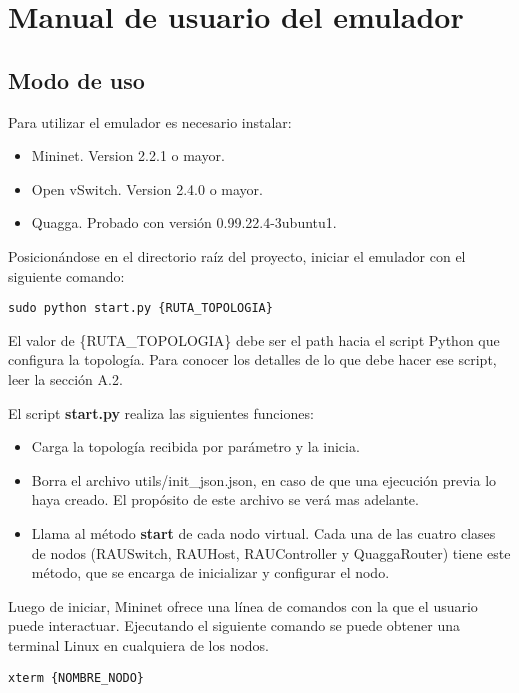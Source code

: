 
\graphicspath{{Appendix1/Figs/}}

\chapter{Manual de usuario del emulador}

\section{Modo de uso}
Para utilizar el emulador es necesario instalar:
\begin{itemize}
	\item Mininet. Version 2.2.1 o mayor.
	\item Open vSwitch. Version 2.4.0 o mayor.
	\item Quagga. Probado con versión 0.99.22.4-3ubuntu1.
\end{itemize}

Posicionándose en el directorio raíz del proyecto, iniciar el emulador con el siguiente comando:
\begin{lstlisting}
sudo python start.py {RUTA_TOPOLOGIA}
\end{lstlisting}

El valor de \{RUTA\_TOPOLOGIA\} debe ser el path hacia el script Python que configura la topología. Para conocer los detalles de lo que debe hacer ese script, leer la sección A.2.

El script \textbf{start.py} realiza las siguientes funciones:
\begin{itemize}
	\item Carga la topología recibida por parámetro y la inicia.
	\item Borra el archivo utils/init\_json.json, en caso de que una ejecución previa lo haya creado. El propósito de este archivo se verá mas adelante.
	\item Llama al método \textbf{start} de cada nodo virtual. Cada una de las cuatro clases de nodos (RAUSwitch, RAUHost, RAUController y QuaggaRouter) tiene este método, que se encarga de inicializar y configurar el nodo.
\end{itemize}

Luego de iniciar, Mininet ofrece una línea de comandos con la que el usuario puede interactuar. Ejecutando el siguiente comando se puede obtener una terminal Linux en cualquiera de los nodos.
\begin{lstlisting}
xterm {NOMBRE_NODO}
\end{lstlisting}

